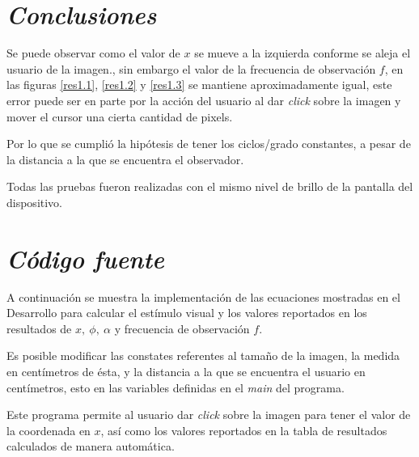 \documentclass[conference]{IEEEtran}
\begin{document}
\section{\textit{Conclusiones}}

Se puede observar como el valor de $x$ se mueve a la izquierda conforme se aleja el usuario de la imagen., sin embargo el valor de la frecuencia de observación $f$, en las figuras \ref{res1.1}, \ref{res1.2} y \ref{res1.3} se mantiene aproximadamente igual, este error puede ser en parte por la acción del usuario al dar \textit{click} sobre la imagen y mover el cursor una cierta cantidad de pixels.

Por lo que se cumplió la hipótesis de tener los ciclos/grado constantes, a pesar de la distancia a la que se encuentra el observador.

Todas las pruebas fueron realizadas con el mismo nivel de brillo de la pantalla del dispositivo.

\section{\textit{Código fuente}}

A continuación se muestra la implementación de las ecuaciones mostradas en el Desarrollo para calcular el estímulo visual y los valores reportados en los resultados de $x,\ \phi,\ \alpha$ y frecuencia de observación $f$.

Es posible modificar las constates referentes al tamaño de la imagen, la medida en centímetros de ésta, y la distancia a la que se encuentra el usuario en centímetros, esto en las variables definidas en el \textit{main} del programa.

Este programa permite al usuario dar \textit{click} sobre la imagen para tener el valor de la coordenada en $x$, así como los valores reportados en la tabla de resultados calculados de manera automática.
\end{document}
